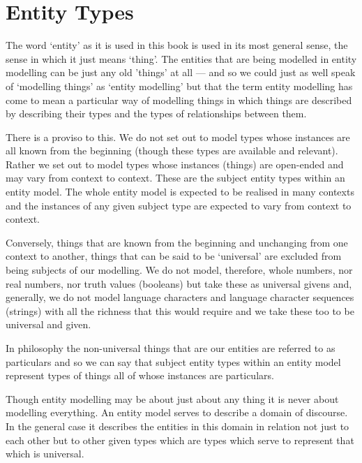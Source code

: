 

\section{Entity Types}

\mynote The word `entity' as it is used in this book is used in its most general sense,  the sense in which it just means `thing'. The entities that are being modelled in entity modelling can be just any old 'things' at all --- and so we could just as well speak of `modelling things' as `entity modelling' but that the term entity modelling
has come to mean a particular way of modelling things in which things are described by describing their types and the types of relationships between them.

\mynote There is a proviso to this. We do not set out to model types whose instances are all known from the beginning (though these types are available and relevant). Rather we set out to model types whose instances (things) are open-ended and may vary from context to context. These are the subject entity types within an entity model. The whole entity model is expected to be realised in many contexts and the instances of any given subject type are expected to vary from context to context.
 
\mynote
Conversely, things that are known from the beginning and unchanging from one context to another, things that can be said to be `universal' are excluded from being subjects of our modelling. We do not model, therefore, whole numbers, nor real numbers, nor truth values (booleans) but take these as universal givens and, generally, we do not model language characters and language character sequences (strings) with all the richness that this would require and we take these too to be universal and given. 

\mynote
In philosophy the non-universal things that are our entities are referred to as particulars and so we can say that subject entity types within an entity model represent types of things all of whose instances are particulars. 

\mynote Though entity modelling may be about just about any thing it is never about modelling everything.
An entity model serves to describe a domain of discourse. In the general case it describes the entities in this domain in relation not just to each other but to other given types which are types which serve to represent that which is universal. 

